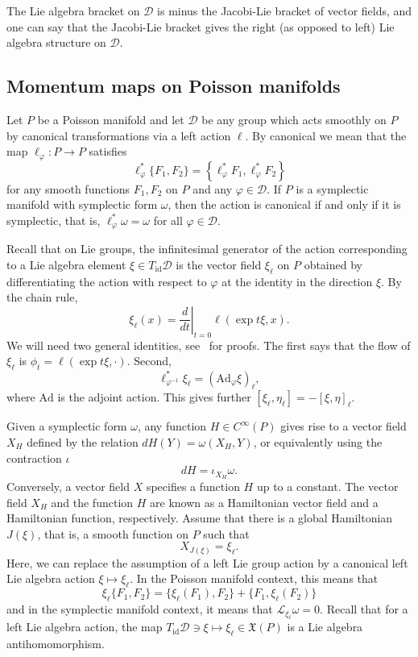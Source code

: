 \documentclass[a5paper,10pt,twoside]{article}
\newcommand{\cL}{\ensuremath{\mathcal{L}}}
\newcommand{\cD}{\ensuremath{\mathcal{D}}}
\DeclareMathOperator*{\id}{id}
\theoremstyle{plain}
\theoremstyle{definition}
\theoremstyle{remark}
\begin{document}
The Lie algebra bracket on $\cD$ is minus the Jacobi-Lie bracket of vector fields, and one can say that the Jacobi-Lie bracket gives the right (as opposed to left) Lie algebra structure on $\cD$.


\subsection{Momentum maps on Poisson manifolds}
Let $P$ be a Poisson manifold and let $\cD$ be any group which acts smoothly on $P$ by canonical transformations via a left action $\ell$. By canonical we mean that the map $\ell_\varphi:P\to P$ satisfies
%
\begin{equation}
\ell_\varphi^*\{F_1,F_2\}=\left\{\ell_\varphi^*F_1,\ell_\varphi^*F_2\right\}
\end{equation}
%
for any smooth functions $F_1,F_2$ on $P$ and any $\varphi\in\cD$. If $P$ is a symplectic manifold with symplectic form $\omega$, then the action is canonical if and only if it is symplectic, that is, $\ell_\varphi^*\omega=\omega$ for all $\varphi\in\cD$.

Recall that on Lie groups, the infinitesimal generator of the action corresponding to a Lie algebra element $\xi\in T_{\id}\cD$ is the vector field $\xi_\ell$ on $P$ obtained by differentiating the action with respect to $\varphi$ at the identity in the direction $\xi$. By the chain rule,
%
\begin{equation}
\xi_\ell(x)=\left.\frac{d}{dt}\right|_{t=0}\ell(\exp t\xi,x).
\end{equation}
%
We will need two general identities, see~\cite{marsden1999mechanics} for proofs. The first says that the flow of $\xi_\ell$ is $\phi_t=\ell(\exp t\xi,\cdot)$. Second, 
\[
\ell_{\varphi^{-1}}^*\xi_\ell=(\mathrm{Ad}_\varphi \xi)_\ell,
\]
where $\mathrm{Ad}$ is the adjoint action. This gives further $[\xi_\ell,\eta_\ell]=-[\xi,\eta]_\ell$.

Given a symplectic form $\omega$, any function $H\in C^\infty(P)$ gives rise to a vector field $X_H$ defined by the relation $dH(Y)=\omega(X_H,Y)$, or equivalently using the contraction $\iota$
%
\begin{equation}
dH=\iota_{X_H}\omega.
\end{equation}
%
Conversely, a vector field $X$ specifies a function $H$ up to a constant. The vector field $X_H$ and the function $H$ are known as a Hamiltonian vector field and a Hamiltonian function, respectively.
Assume that there is a global Hamiltonian $J(\xi)$, that is, a smooth function on $P$ such that
%
\begin{equation}
\label{globalhamiltonian}
X_{J(\xi)}=\xi_\ell.
\end{equation}
%
Here, we can replace the assumption of a left Lie group action by a canonical left Lie algebra action $\xi\mapsto\xi_\ell$. In the Poisson manifold context, this means that
%
\begin{equation}
\xi_\ell \{F_1,F_2\}=\{\xi_\ell(F_1),F_2\}+\{F_1,\xi_\ell(F_2)\}
\end{equation}
%
and in the symplectic manifold context, it means that $\cL_{\xi_\ell}\omega=0.$ Recall that for a left Lie algebra action, the map $T_{\id}\cD\ni \xi\mapsto \xi_\ell \in\mathfrak{X}(P)$ is a Lie algebra antihomomorphism.
\end{document}
